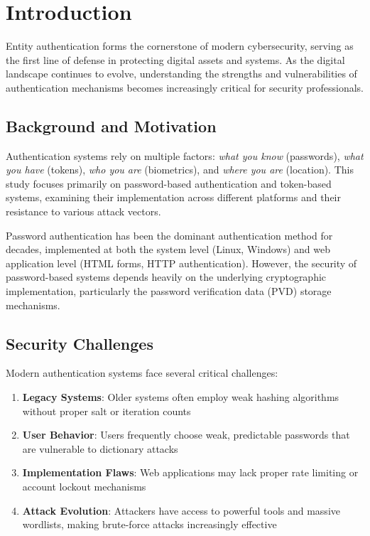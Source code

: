 \section{Introduction}

Entity authentication forms the cornerstone of modern cybersecurity, serving as the first line of defense in protecting digital assets and systems. As the digital landscape continues to evolve, understanding the strengths and vulnerabilities of authentication mechanisms becomes increasingly critical for security professionals.

\subsection{Background and Motivation}

Authentication systems rely on multiple factors: \textit{what you know} (passwords), \textit{what you have} (tokens), \textit{who you are} (biometrics), and \textit{where you are} (location). This study focuses primarily on password-based authentication and token-based systems, examining their implementation across different platforms and their resistance to various attack vectors.

Password authentication has been the dominant authentication method for decades, implemented at both the system level (Linux, Windows) and web application level (HTML forms, HTTP authentication). However, the security of password-based systems depends heavily on the underlying cryptographic implementation, particularly the password verification data (PVD) storage mechanisms.

\subsection{Security Challenges}

Modern authentication systems face several critical challenges:

\begin{enumerate}
    \item \textbf{Legacy Systems}: Older systems often employ weak hashing algorithms without proper salt or iteration counts
    \item \textbf{User Behavior}: Users frequently choose weak, predictable passwords that are vulnerable to dictionary attacks
    \item \textbf{Implementation Flaws}: Web applications may lack proper rate limiting or account lockout mechanisms
    \item \textbf{Attack Evolution}: Attackers have access to powerful tools and massive wordlists, making brute-force attacks increasingly effective
\end{enumerate}

